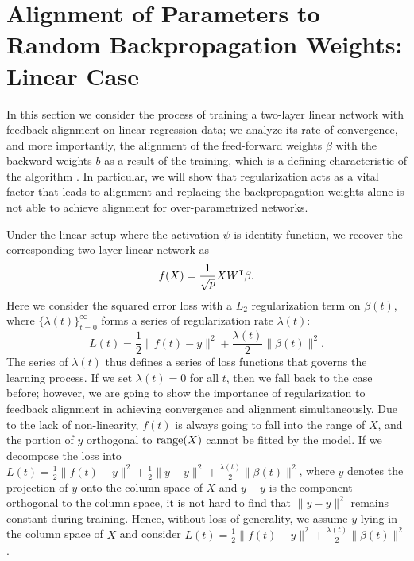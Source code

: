 \section{Alignment of Parameters to Random Backpropagation Weights: Linear Case}\label{sec:alignment}

In this section we consider the process of training a two-layer linear network with feedback alignment on linear regression data; we analyze its rate of convergence, and more importantly, the alignment of the feed-forward weights $\beta$ with the backward weights $b$ as a result of the training, which is a defining characteristic of the algorithm \citep{lillicrap2016random}. In particular, we will show that regularization acts as a vital factor that leads to alignment and replacing the backpropagation weights alone is not able to achieve alignment for over-parametrized networks.

Under the linear setup where the activation $\psi$ is identity function, we recover the corresponding two-layer linear network as 
\begin{align}\label{eqn:linear-network}
    f(X) = \frac{1}{\sqrt p}XW\transpose\beta.
\end{align}
Here we consider the squared error loss with a $L_2$ regularization term on $\beta(t)$, where $\{\lambda(t)\}_{t=0}^\infty$ forms a series of regularization rate $\lambda(t)$:
\begin{equation}\label{eqn:loss-with-reg}
    L(t) = \frac{1}{2}\|f(t) - y\|^2 + \frac{\lambda(t)}{2}\|\beta(t)\|^2.
\end{equation}
The series of $\lambda(t)$ thus defines a series of loss functions that governs the learning process. If we set $\lambda(t) = 0$ for all $t$, then we fall back to the case before; however, we are going to show the importance of regularization to feedback alignment in achieving convergence and alignment simultaneously. Due to the lack of non-linearity, $f(t)$ is always going to fall into the range of $X$, and the portion of $y$ orthogonal to $\operatorname{\mathrm{range}}(X)$ cannot be fitted by the model. If we decompose the loss into $L(t) = \frac{1}{2}\|f(t) - \bar y\|^2 + \frac{1}{2}\|y - \bar y\|^2 + \frac{\lambda(t)}{2}\|\beta(t)\|^2$, where $\bar y$ denotes the projection of $y$ onto the column space of $X$ and $y-\bar y$ is the component orthogonal to the column space, it is not hard to find that $\|y - \bar y\|^2$ remains constant during training. Hence, without loss of generality, we assume $y$ lying in the column space of $X$ and consider $L(t) = \frac{1}{2}\|f(t) - \bar y\|^2 + \frac{\lambda(t)}{2}\|\beta(t)\|^2$. 

